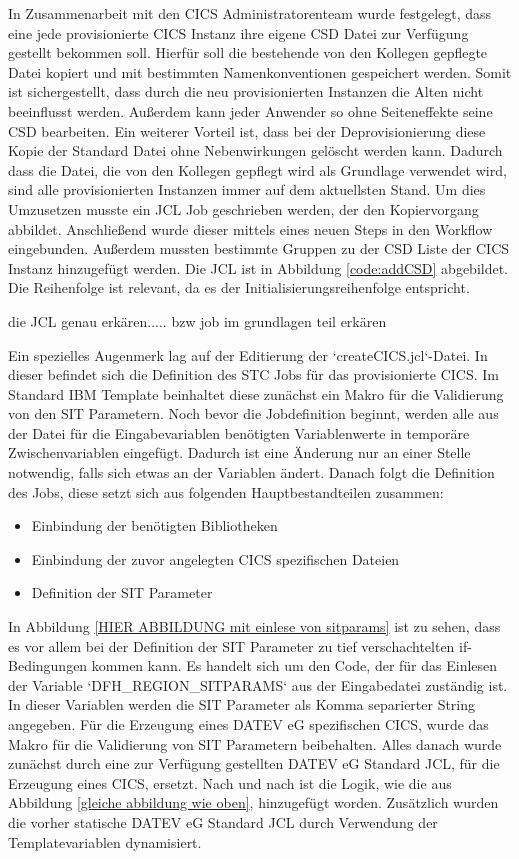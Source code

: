In Zusammenarbeit mit den CICS Administratorenteam wurde festgelegt, dass eine jede provisionierte CICS Instanz ihre eigene CSD Datei zur Verfügung gestellt bekommen soll.
Hierfür soll die bestehende von den Kollegen gepflegte Datei kopiert und mit bestimmten Namenkonventionen gespeichert werden.
Somit ist sichergestellt, dass durch die neu provisionierten Instanzen die Alten nicht beeinflusst werden.
Außerdem kann jeder Anwender so ohne Seiteneffekte seine CSD bearbeiten.
Ein weiterer Vorteil ist, dass bei der Deprovisionierung diese Kopie der Standard Datei ohne Nebenwirkungen gelöscht werden kann.
Dadurch dass die Datei, die von den Kollegen gepflegt wird als Grundlage verwendet wird, sind alle provisionierten Instanzen immer auf dem aktuellsten Stand.
Um dies Umzusetzen musste ein JCL Job geschrieben werden, der den Kopiervorgang abbildet.
Anschließend wurde dieser mittels eines neuen Steps in den Workflow eingebunden.
Außerdem mussten bestimmte Gruppen zu der CSD Liste der CICS Instanz hinzugefügt werden.
Die JCL ist in Abbildung \ref{code:addCSD} abgebildet.
Die Reihenfolge ist relevant, da es der Initialisierungsreihenfolge entspricht.

die JCL genau erkären..... bzw job im grundlagen teil erkären

Ein spezielles Augenmerk lag auf der Editierung der `createCICS.jcl`-Datei.
In dieser befindet sich die Definition des STC Jobs für das provisionierte CICS.
Im Standard IBM Template beinhaltet diese zunächst ein Makro für die Validierung von den SIT Parametern.
Noch bevor die Jobdefinition beginnt, werden alle aus der Datei für die Eingabevariablen benötigten Variablenwerte in temporäre Zwischenvariablen eingefügt.
Dadurch ist eine Änderung nur an einer Stelle notwendig, falls sich etwas an der Variablen ändert.
Danach folgt die Definition des Jobs, diese setzt sich aus folgenden Hauptbestandteilen zusammen:\\
\begin{itemize}
\item Einbindung der benötigten Bibliotheken
\item Einbindung der zuvor angelegten CICS spezifischen Dateien
\item Definition der SIT Parameter
\end{itemize}
In Abbildung \ref{HIER ABBILDUNG mit einlese von sitparams} ist zu sehen, dass es vor allem bei der Definition der SIT Parameter zu tief verschachtelten if-Bedingungen kommen kann.
Es handelt sich um den Code, der für das Einlesen der Variable `DFH\_REGION\_SITPARAMS` aus der Eingabedatei zuständig ist.
In dieser Variablen werden die SIT Parameter als Komma separierter String angegeben.
Für die Erzeugung eines DATEV eG spezifischen CICS, wurde das Makro für die Validierung von SIT Parametern beibehalten.
Alles danach wurde zunächst durch eine zur Verfügung gestellten DATEV eG Standard JCL, für die Erzeugung eines CICS, ersetzt.
Nach und nach ist die Logik, wie die aus Abbildung \ref{gleiche abbildung wie oben}, hinzugefügt worden.
Zusätzlich wurden die vorher statische DATEV eG Standard JCL durch Verwendung der Templatevariablen dynamisiert.

